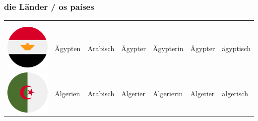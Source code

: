         \subsubsection{die Länder / os países}\label{subsubsection:deutsch:ich_vorstellen:lander}

            \begin{longtabu}to 
                \toprule
                &  &  &  &  \\ 
                & & &  &  &  &\\ 
                \toprule \endhead
                    \includegraphics[width=0.5\linewidth]{figures/lander/egypt.png} & Ägypten & Arabisch & Ägypter & Ägypterin & Ägypter & ägyptisch\\ \hline
                    \includegraphics[width=0.5\linewidth]{figures/lander/algeria.png} & Algerien & Arabisch & Algerier & Algerierin & Algerier & algerisch \\ \hline

\end{longtabu}

